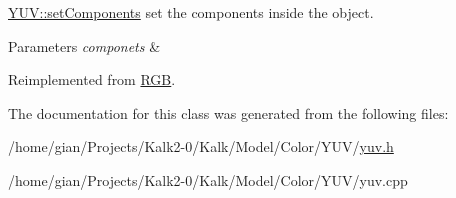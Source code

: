 \hyperlink{class_y_u_v_a622daf7a688da4a227b63deb412c0d46}{Y\+U\+V\+::set\+Components} set the components inside the object. 


\begin{DoxyParams}{Parameters}
{\em componets} & \\
\hline
\end{DoxyParams}


Reimplemented from \hyperlink{class_r_g_b_acf213178f2029a5f304d62b87dbb6b36}{R\+GB}.



The documentation for this class was generated from the following files\+:\begin{DoxyCompactItemize}
\item 
/home/gian/\+Projects/\+Kalk2-\/0/\+Kalk/\+Model/\+Color/\+Y\+U\+V/\hyperlink{yuv_8h}{yuv.\+h}\item 
/home/gian/\+Projects/\+Kalk2-\/0/\+Kalk/\+Model/\+Color/\+Y\+U\+V/yuv.\+cpp\end{DoxyCompactItemize}
